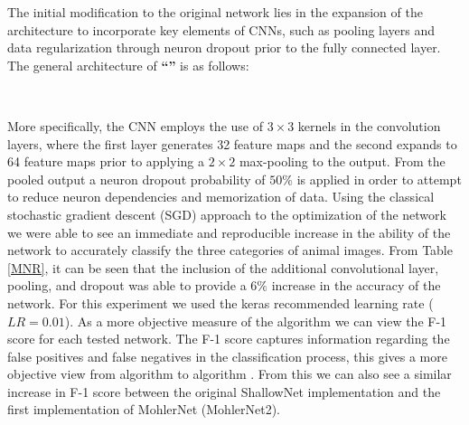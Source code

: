 \documentclass[12pt]{article}
\begin{document}
The initial modification to the original network lies in the expansion of the architecture to incorporate key elements of CNNs, such as pooling layers and data regularization through neuron dropout prior to the fully connected layer. The general architecture of \textbf{``''} is as follows: 
\begin{center}
	 \\
\end{center}
More specifically, the CNN employs the use of $3\times3$ kernels in the convolution layers, where the first layer generates 32 feature maps and the second expands to 64 feature maps prior to applying a $2\times2$ max-pooling to the output. From the pooled output a neuron dropout probability of $50\%$ is applied in order to attempt to reduce neuron dependencies and memorization of data. Using the classical stochastic gradient descent (SGD) approach to the optimization of the network we were able to see an immediate and reproducible increase in the ability of the network to accurately classify the three categories of animal images.  From Table \ref{MNR}, it can be seen that the inclusion of the additional convolutional layer, pooling, and dropout was able to provide a $6\%$ increase in the accuracy of the network. For this experiment we used the keras recommended learning rate ($LR = 0.01$). As a more objective measure of the algorithm we can view the F-1 score for each tested network. The F-1 score captures information regarding the false positives and false negatives in the classification process, this gives a more objective view from algorithm to algorithm . From this we can also see a similar increase in F-1 score between the original ShallowNet implementation and the first implementation of MohlerNet (MohlerNet2). 
\end{document}
